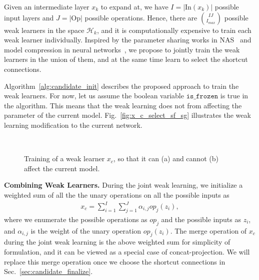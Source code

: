 Given an intermediate layer $x_{k}$ to expand at, we have $I = |\text{In}(x_{k})|$ possible input layers and $J = |\text{Op}|$ possible operations.
Hence, there are $\binom{IJ}{I_{max}}$ possible weak learners
in the space $\mathcal{H}_{k}$, and it is computationally expensive to train each weak learner individually. 
Inspired by the parameter sharing works in NAS~\citep{Pham2018EfficientNA,Liu2018DARTSDA} and model compression in neural networks~\citep{huang2017condensenet},
we propose to jointly train the weak learners in the union of them, 
and at the same time learn to select the shortcut connections. 


Algorithm~\ref{alg:candidate_init} describes the proposed approach to train the weak learners. 
For now, let us assume the boolean variable
$\texttt{is\_frozen}$ is true in the algorithm. This means that the weak learning does not from affecting the parameter of the current model. 
Fig.~\ref{fig:x_c_select_sf_sg} illustrates the weak learning modification to the current network. 

\begin{figure}[ht]
\centering
{}
    ~
    \caption{Training of a weak learner $x_c$, so that it can (a) and cannot (b) affect the current model.}
\end{figure}

\textbf{Combining Weak Learners.} During the joint weak learning, we initialize a weighted sum of all the the unary operations on all the possible inputs as
\begin{align}
    x_c = \sum _{i=1}^I \sum_{j=1}^J \alpha_{i,j} op_j(z_i),
    \label{eq:x_c_select}
\end{align}
where we enumerate the possible operations as $op_j$ and the possible inputs as $z_i$, and $\alpha_{i,j}$ is the weight of the unary operation $op_j(z_i)$. 
The merge operation of $x_c$ during the joint weak learning is the above weighted sum for simplicity of formulation, and it can be viewed as a special case 
of concat-projection. We will replace this merge operation once we choose the shortcut connections in Sec.~\ref{sec:candidate_finalize}. 

